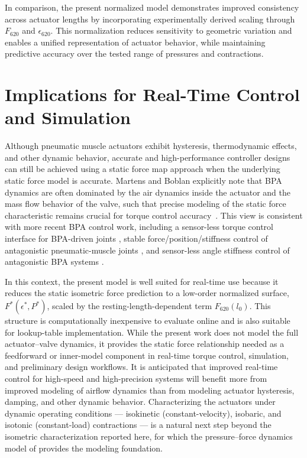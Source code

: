 In comparison, the present normalized model demonstrates improved consistency across actuator lengths by incorporating experimentally derived scaling through $F_{620}$ and $\epsilon_{620}$. This normalization reduces sensitivity to geometric variation and enables a unified representation of actuator behavior, while maintaining predictive accuracy over the tested range of pressures and contractions.


\section{Implications for Real-Time Control and Simulation}

Although pneumatic muscle actuators exhibit hysteresis, thermodynamic effects, and other dynamic behavior, accurate and high-performance controller designs can still be achieved using a static force map approach when the underlying static force model is accurate. Martens and Boblan explicitly note that BPA dynamics are often dominated by the air dynamics inside the actuator and the mass flow behavior of the valve, such that precise modeling of the static force characteristic remains crucial for torque control \mbox{accuracy \citep{martens_modeling_2017}.} This view is consistent with more recent BPA control work, including a sensor-less torque control interface for BPA-driven joints \citep{martens_framework_2018}, stable force/position/stiffness control of antagonistic pneumatic-muscle joints \citep{ugurlu2019stable, hunt_development_2017}, and sensor-less angle stiffness control of antagonistic BPA systems \citep{shinSensorlessAngleStiffness2022}. 

In this context, the present model is well suited for real-time use because it reduces the static isometric force prediction to a low-order normalized surface, $F^*(\epsilon^*,P^*)$, scaled by the resting-length-dependent term $F_{620}(l_0)$. This structure is computationally inexpensive to evaluate online and is also suitable for lookup-table implementation. While the present work does not model the full actuator--valve dynamics, it provides the static force relationship needed as a feedforward or inner-model component in real-time torque control, simulation, and preliminary design workflows. It is anticipated that improved real-time control for high-speed and high-precision systems will benefit more from improved modeling of airflow dynamics than from modeling actuator hysteresis, damping, and other dynamic behavior. Characterizing the actuators under dynamic operating conditions --- isokinetic (constant-velocity), isobaric, and isotonic (constant-load) contractions --- is a natural next step beyond the isometric characterization reported here, for which the pressure--force dynamics model of \citet{elzein_pressure_2025} provides the modeling foundation.



